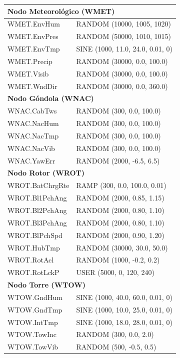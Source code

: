 \begin{longtable}{@{}p{7cm}p{7cm}@{}}
\midrule
\multicolumn{2}{l}{\textbf{Nodo Meteorológico (WMET)}} \\
\midrule
WMET.EnvHum & RANDOM (10000, 1005, 1020) \\
WMET.EnvPres & RANDOM (50000, 1010, 1015) \\
WMET.EnvTmp & SINE (1000, 11.0, 24.0, 0.01, 0) \\
WMET.Precip & RANDOM (30000, 0.0, 100.0) \\
WMET.Visib & RANDOM (30000, 0.0, 100.0) \\
WMET.WndDir & RANDOM (30000, 0.0, 360.0) \\

\midrule
\multicolumn{2}{l}{\textbf{Nodo Góndola (WNAC)}} \\
\midrule
WNAC.CabTws & RANDOM (300, 0.0, 100.0) \\
WNAC.NacHum & RANDOM (300, 0.0, 100.0) \\
WNAC.NacTmp & RANDOM (300, 0.0, 100.0) \\
WNAC.NacVib & RANDOM (300, 0.0, 100.0) \\
WNAC.YawErr & RANDOM (2000, -6.5, 6.5) \\

\midrule
\multicolumn{2}{l}{\textbf{Nodo Rotor (WROT)}} \\
\midrule
WROT.BatChrgRte & RAMP (300, 0.0, 100.0, 0.01) \\
WROT.Bl1PchAng & RANDOM (2000, 0.85, 1.15) \\
WROT.Bl2PchAng & RANDOM (2000, 0.80, 1.10) \\
WROT.Bl3PchAng & RANDOM (2000, 0.80, 1.10) \\
WROT.BlPchSpd & RANDOM (2000, 0.90, 1.20) \\
WROT.HubTmp & RANDOM (30000, 30.0, 50.0) \\
WROT.RotAcl & RANDOM (1000, -0.2, 0.2) \\
WROT.RotLckP & USER (5000, 0, 120, 240) \\

\midrule
\multicolumn{2}{l}{\textbf{Nodo Torre (WTOW)}} \\
\midrule
WTOW.GndHum & SINE (1000, 40.0, 60.0, 0.01, 0) \\
WTOW.GndTmp & SINE (1000, 10.0, 25.0, 0.01, 0) \\
WTOW.IntTmp & SINE (1000, 18.0, 28.0, 0.01, 0) \\
WTOW.TowInc & RANDOM (300, 0.0, 2.0) \\
WTOW.TowVib & RANDOM (500, -0.5, 0.5) \\


\end{longtable}
